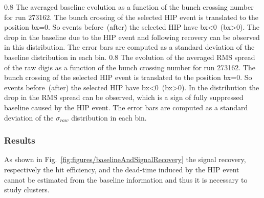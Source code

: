                  {0.8}       %
                 {The averaged baseline evolution as a function of the bunch crossing number for run 273162. The bunch crossing of the selected HIP event is translated to the position bx=0. So events before~(after) the selected HIP have bx<0~(bx>0). The drop in the baseline due to the HIP event and following recovery can be observed in this distribution. The error bars are computed as a standard deviation of the baseline distribution in each bin. } %
                 {0.8}       %
                 {The evolution of the averaged RMS spread of the raw digis as a function of the bunch crossing number for run 273162. The bunch crossing of the selected HIP event is translated to the position bx=0. So events before~(after) the selected HIP have bx<0~(bx>0). In the distribution the drop in the RMS spread can be observed, which is a sign of fully suppressed baseline caused by the HIP event. The error bars are computed as a standard deviation of the $\sigma_{raw}$ distribution in each bin.  } %

\subsubsection{Results}

As shown in Fig.~\ref{fig:figures/baselineAndSignalRecovery} the signal recovery, respectively the hit efficiency, and the dead-time induced by the HIP event cannot be estimated from the baseline information and thus it is necessary to study clusters.

